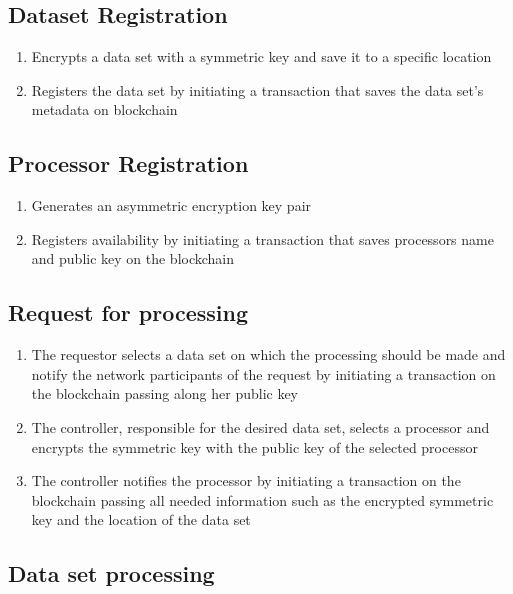 \subsection{Dataset Registration}
\label{solution:flow:reg_data}

\begin{enumerate}
  \item Encrypts a data set with a symmetric key and save it to a specific location
  \item Registers the data set by initiating a transaction that saves the data set's metadata on blockchain
\end{enumerate}

\subsection{Processor Registration}
\label{solution:flow:pr_reg}

\begin{enumerate}
  \item Generates an asymmetric encryption key pair
  \item Registers availability by initiating a transaction that saves processors name and public key on the blockchain
\end{enumerate}

\subsection{Request for processing}
\label{solution:flow:pr_reg}

\begin{enumerate}
  \item The requestor selects a data set on which the processing should be made and  notify the network participants of the request by initiating a transaction on the blockchain passing along her public key
  \item The controller, responsible for the desired data set, selects a processor and encrypts the symmetric key with the public key of the selected processor
  \item The controller notifies the processor by initiating a transaction on the blockchain passing all needed information such as the encrypted symmetric key and the location of the data set
\end{enumerate}

\subsection{Data set processing}
\label{solution:flow:pr_data}

